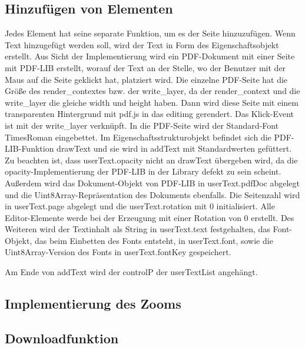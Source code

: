 \subsection{Hinzufügen von Elementen}
Jedes Element hat seine separate Funktion, um es der Seite hinzuzufügen. Wenn Text hinzugefügt werden soll, wird der Text in Form des Eigenschaftsobjekt erstellt. Aus Sicht der Implementierung wird ein PDF-Dokument mit einer Seite mit PDF-LIB erstellt, worauf der Text an der Stelle, wo der Benutzer mit der Maus auf die Seite geklickt hat, platziert wird. Die einzelne PDF-Seite hat die Größe des render\_contextes bzw. der write\_layer, da der render\_context und die write\_layer die gleiche width und height haben. Dann wird diese Seite mit einem transparenten Hintergrund mit pdf.js in das editimg gerendert. Das Klick-Event ist mit der write\_layer verknüpft. In die PDF-Seite wird der Standard-Font TimesRoman eingebettet. Im Eigenschaftsstrukturobjekt befindet sich die PDF-LIB-Funktion drawText und sie wird in addText mit Standardwerten gefüttert. Zu beachten ist, dass userText.opacity nicht an drawText übergeben wird, da die opacity-Implementierung der PDF-LIB in der Library defekt zu sein scheint. Außerdem wird das Dokument-Objekt von PDF-LIB in userText.pdfDoc abgelegt und die Uint8Array-Repräsentation des Dokuments ebenfalls. Die Seitenzahl wird in userText.page abgelegt und die userText.rotation mit 0 initialisiert. Alle Editor-Elemente werde bei der Erzeugung mit einer Rotation von 0 erstellt. Des Weiteren wird der Textinhalt als String in userText.text festgehalten, das Font-Objekt, das beim Einbetten des Fonts entsteht, in userText.font, sowie die Uint8Array-Version des Fonts in userText.fontKey gespeichert. 

Am Ende von addText wird der controlP der userTextList angehängt.

\subsection{Implementierung des Zooms}

\subsection{Downloadfunktion}